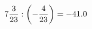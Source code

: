 \documentclass[preview]{standalone}
\begin{document}
\begin{align*}
7 { 3 \over 23 }  :  \left( - { 4 \over 23 } \right) = -41.0
\end{align*}
\end{document}
